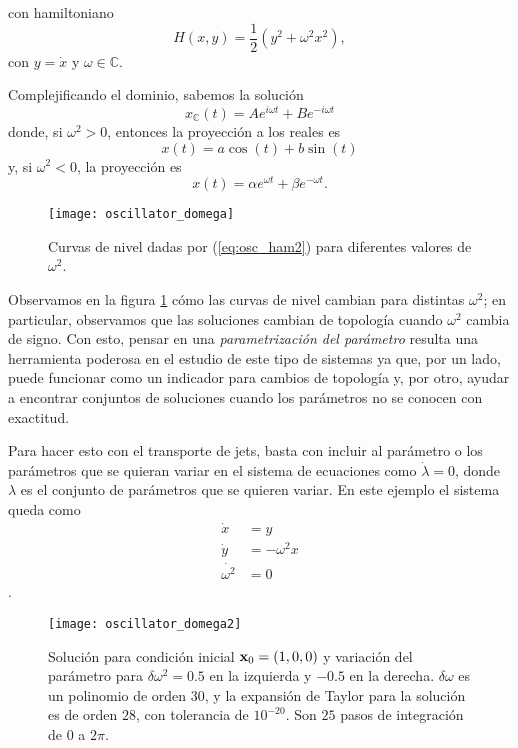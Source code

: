 con hamiltoniano
\begin{equation}
 H(x,y) = \frac{1}{2} \left( y^2 + \omega ^2 x^2 \right),
 \label{eq:osc_ham2}
\end{equation}
con $y = \dot{x}$ y $\omega \in \mathbb{C}$.

Complejificando el dominio, sabemos la solución
\begin{equation*}
 x_{\mathbb{C}}(t) = A e^{i\omega t} + B e^{-i \omega t}
\end{equation*}
donde, si $\omega^2 > 0$, entonces la proyección a los reales es
\begin{equation}
 x(t) = a \cos(t) + b \sin (t)
 \label{eq:ho_solution_trig}
\end{equation}
y, si $\omega^2 < 0$, la proyección es
\begin{equation}
 x(t) = \alpha e^{\omega t} + \beta e^{- \omega t}.
 \label{eq:ho_solution_exp}
\end{equation}

\begin{figure}[h!]
 \centering
 \texttt{[image: oscillator\_domega]}
 \caption{Curvas de nivel dadas por (\ref{eq:osc_ham2}) para diferentes valores de $\omega^2$.}
 \label{fig:oscillator_domega}
\end{figure}

Observamos en la figura \ref{fig:oscillator_domega} cómo las curvas de nivel cambian para distintas $\omega^2$; en particular, observamos que las soluciones cambian de topología cuando $\omega^2$ cambia de signo. Con esto, pensar en una \textit{parametrización del parámetro} resulta una herramienta poderosa en el estudio de este tipo de sistemas ya que, por un lado, puede funcionar como un indicador para cambios de topología y, por otro, ayudar a encontrar conjuntos de soluciones cuando los parámetros no se conocen con exactitud. 

Para hacer esto con el transporte de jets, basta con incluir al parámetro o los parámetros que se quieran variar en el sistema de ecuaciones como $\dot{\lambda} = 0$, donde $\lambda$ es el conjunto de parámetros que se quieren variar. En este ejemplo el sistema queda como
\begin{align*}
 \dot{x} &= y \\
 \dot{y} &= - \omega^2 x \\
 \dot{\omega^2} &= 0
\end{align*}.
 
\begin{figure}[h!]
 \centering 
 \texttt{[image: oscillator\_domega2]}
 \caption{Solución para condición inicial $\mathbf{x}_0 = (1,0,0)$ y variación del parámetro para $\delta \omega^2 = 0.5$ en la izquierda y $-0.5$ en la derecha. $\delta \omega$ es un polinomio de orden $30$, y la expansión de Taylor para la solución es de orden $28$, con tolerancia de $10^{-20}$. Son $25$ pasos de integración de $0$ a $2 \pi$.}
 \label{fig:oscillator_param_transport}
\end{figure}

